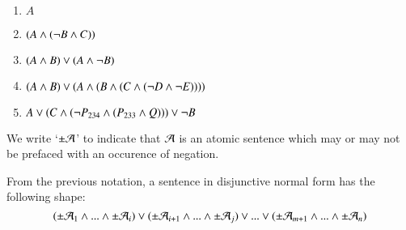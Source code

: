 \documentclass[12pt, a4paper, twoside, openright, titlepage]{book}
\begin{document}
\begin{eg}{}{}
    \leavevmode
    \begin{enumerate}
        \item $A$
        \item $(A\wedge (\neg B\wedge C))$
        \item $(A\wedge B)\vee (A\wedge \neg B)$
        \item $(A\wedge B)\vee(A\wedge (B\wedge(C\wedge(\neg D\wedge\neg E))))$
        \item $A\vee (C\wedge(\neg P_{234}\wedge (P_{233}\wedge Q)))\vee \neg B$
    \end{enumerate}
\end{eg}

\begin{nota*}{}{}
    We write `$\pm\mathcal{A}$' to indicate that $\mathcal{A}$ is an atomic sentence which may or may not be prefaced with an occurence of negation. 
\end{nota*}

\begin{rmk}{}{}
    From the previous notation, a sentence in disjunctive normal form has the following shape: \begin{equation*}
        (\pm\mathcal{A}_1\wedge ...\wedge\pm\mathcal{A}_i)\vee(\pm\mathcal{A}_{i+1}\wedge ...\wedge\pm\mathcal{A}_j)\vee...\vee(\pm\mathcal{A}_{m+1}\wedge ...\wedge\pm\mathcal{A}_n)
    \end{equation*}
\end{rmk}
\end{document}
